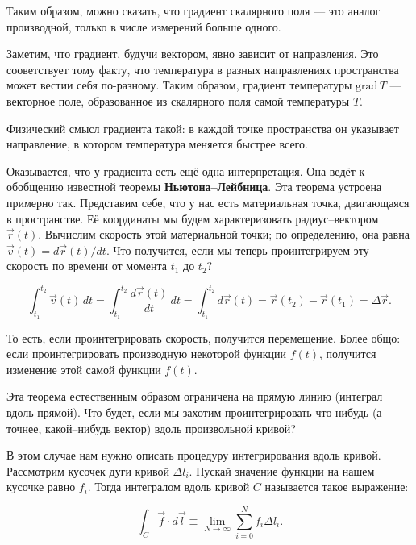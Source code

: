 \documentclass[12pt,a4paper]{article}
\numberwithin{equation}{section}
\numberwithin{equation}{section}
\newcommand{\grad}{\mathrm{grad}\,}
\begin{document}
Таким образом, можно сказать, что градиент скалярного поля --- это
аналог производной, только в числе измерений больше одного. 

Заметим, что градиент, будучи вектором, явно зависит от
направления. Это сооветствует тому факту, что температура в разных
направлениях пространства может вестии себя по-разному. Таким образом,
градиент температуры $\grad T$ --- векторное поле, образованное из скалярного
поля самой температуры $T$.

Физический смысл градиента такой: в каждой точке пространства он
указывает направление, в котором температура меняется быстрее всего. 

Оказывается, что у градиента есть ещё одна интерпретация. Она ведёт к
обобщению известной теоремы \textbf{Ньютона--Лейбница}. Эта теорема
устроена примерно так. Представим себе, что у нас есть материальная
точка, двигающаяся в пространстве. Её координаты мы будем
характеризовать радиус--вектором $\vec{r}(t)$. Вычислим скорость этой
материальной точки; по определению, она равна $\vec{v} (t) = d
\vec{r}(t) / dt$. Что получится, если мы теперь проинтегрируем эту
скорость по времени от момента $t_1$ до $t_2$? 

\begin{equation}
  \label{eq:newton_leibnitz}
  \int_{t_1}^{t_2} \vec{v}(t) \, dt = \int_{t_1}^{t_2}
  \frac{d\vec{r}(t)} {dt} \, dt = \int_{t_1}^{t_2} d\vec{r}(t) =
  \vec{r}(t_2) - \vec{r}(t_1) = \Delta \vec{r}.
\end{equation}

То есть, если проинтегрировать скорость, получится перемещение. Более
общо: если проинтегрировать производную некоторой функции $f(t)$,
получится изменение этой самой функции $f(t)$. 

Эта теорема естественным образом ограничена на прямую линию (интеграл
вдоль прямой). Что будет, если мы захотим проинтегрировать что-нибудь
(а точнее, какой--нибудь вектор) вдоль произвольной кривой? 

В этом случае нам нужно описать процедуру интегрирования вдоль
кривой. Рассмотрим кусочек дуги кривой $\Delta l_i$. Пускай значение функции
на нашем кусочке равно $f_i$. Тогда интегралом вдоль кривой $C$
называется такое выражение:

\begin{equation}
  \label{eq:def_curve_int_1}
  \int_C  \vec{f} \cdot d\vec{l} \equiv \lim_{N\to \infty} \sum_{i=0}^N f_i \Delta l_i. 
\end{equation}
\end{document}
